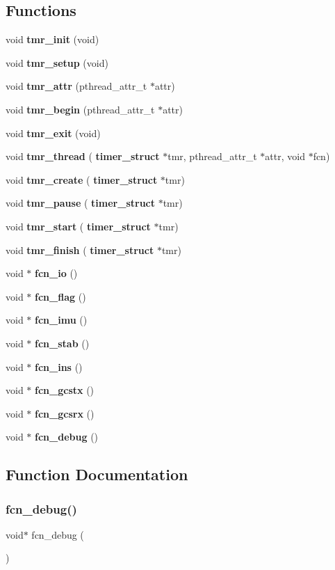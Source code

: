 \subsection*{Functions}
\begin{DoxyCompactItemize}
\item 
void \textbf{ tmr\+\_\+init} (void)
\item 
void \textbf{ tmr\+\_\+setup} (void)
\item 
void \textbf{ tmr\+\_\+attr} (pthread\+\_\+attr\+\_\+t $\ast$attr)
\item 
void \textbf{ tmr\+\_\+begin} (pthread\+\_\+attr\+\_\+t $\ast$attr)
\item 
void \textbf{ tmr\+\_\+exit} (void)
\item 
void \textbf{ tmr\+\_\+thread} (\textbf{ timer\+\_\+struct} $\ast$tmr, pthread\+\_\+attr\+\_\+t $\ast$attr, void $\ast$fcn)
\item 
void \textbf{ tmr\+\_\+create} (\textbf{ timer\+\_\+struct} $\ast$tmr)
\item 
void \textbf{ tmr\+\_\+pause} (\textbf{ timer\+\_\+struct} $\ast$tmr)
\item 
void \textbf{ tmr\+\_\+start} (\textbf{ timer\+\_\+struct} $\ast$tmr)
\item 
void \textbf{ tmr\+\_\+finish} (\textbf{ timer\+\_\+struct} $\ast$tmr)
\item 
void $\ast$ \textbf{ fcn\+\_\+io} ()
\item 
void $\ast$ \textbf{ fcn\+\_\+flag} ()
\item 
void $\ast$ \textbf{ fcn\+\_\+imu} ()
\item 
void $\ast$ \textbf{ fcn\+\_\+stab} ()
\item 
void $\ast$ \textbf{ fcn\+\_\+ins} ()
\item 
void $\ast$ \textbf{ fcn\+\_\+gcstx} ()
\item 
void $\ast$ \textbf{ fcn\+\_\+gcsrx} ()
\item 
void $\ast$ \textbf{ fcn\+\_\+debug} ()
\end{DoxyCompactItemize}


\subsection{Function Documentation}
\mbox{\label{timer_8c_a7265f09ae3d88c75980be15d49543d9e}} 
\subsubsection{fcn\+\_\+debug()}
{\footnotesize\ttfamily void$\ast$ fcn\+\_\+debug (\begin{DoxyParamCaption}{ }\end{DoxyParamCaption})}

